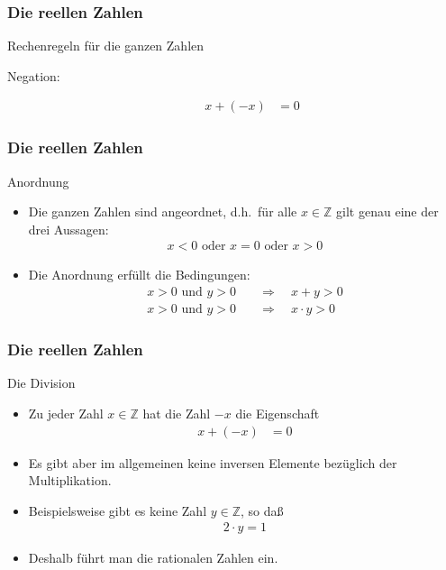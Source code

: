 \documentclass{beamer}
\newcommand\ZZ{\mathbb Z}
\newcommand{\ue}{\"u}
\newcommand{\mytitle}{Die reellen Zahlen}
\begin{document}
\begin{frame}\frametitle{\mytitle}
	\begin{block}{Rechenregeln f\ue r die ganzen Zahlen}
		\begin{description}
			\item[Negation:] 
					\begin{align*}
						x+(-x)&=0
			\end{align*}
		\end{description}
	\end{block}
\end{frame}

\begin{frame}\frametitle{\mytitle}
	\begin{block}{Anordnung}
	\begin{itemize}
	\item Die ganzen Zahlen sind angeordnet, d.h.\ f\ue r alle $x\in\ZZ$ gilt genau eine der drei Aussagen:
		\begin{align*}
			x<0\mbox{ oder }x=0\mbox{ oder }x>0
		\end{align*}
	\item Die Anordnung erf\ue llt die Bedingungen:
		\begin{align*}
			x>0\mbox{ und }y>0\quad&\Rightarrow\quad x+y>0\\
			x>0\mbox{ und }y>0\quad&\Rightarrow\quad x\cdot y>0
		\end{align*}
	\end{itemize}
	\end{block}
\end{frame}

\begin{frame}\frametitle{\mytitle}
	\begin{block}{Die Division}
	\begin{itemize}
		\item Zu jeder Zahl $x\in\ZZ$ hat die Zahl $-x$ die Eigenschaft
			\begin{align*}
				x+(-x)&=0
			\end{align*}
		\item Es gibt aber im allgemeinen keine inversen Elemente bez\ue glich der Multiplikation.
		\item Beispielsweise gibt es keine Zahl $y\in\ZZ$, so da\ss\
			\begin{align*}
			2\cdot y=1
			\end{align*}
		\item Deshalb f\ue hrt man die rationalen Zahlen ein.
	\end{itemize}
	\end{block}
\end{frame}
\end{document}

